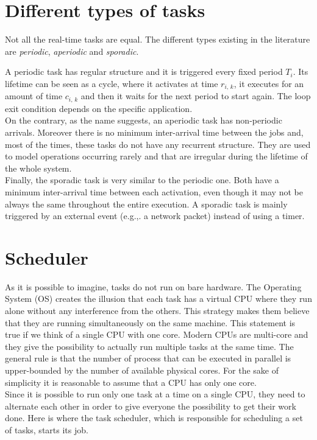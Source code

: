 \section{Different types of tasks}
Not all the real-time tasks are equal. The different types existing in
the literature are \emph{periodic}, \emph{aperiodic} and \emph{sporadic}.

A periodic task has regular structure
and it is triggered every fixed period \( T_{i} \). Its lifetime can be seen as
a cycle, where it activates at time \( r_{i,\,k} \), it executes for an amount 
of time \( c_{i,\,k} \) and then it waits for the next period to start again.
The loop exit condition depends on the specific application.\\
On the contrary, as the name suggests, an aperiodic task has non-periodic arrivals.
Moreover there is no minimum inter-arrival time between the jobs and,
most of the times, these tasks do not have any recurrent structure. They are used
to model operations occurring rarely and that are irregular during the lifetime
of the whole system.\\
Finally, the sporadic task is very similar to the periodic one. Both have a minimum
inter-arrival time between each activation, even though it may not be always the
same throughout the entire execution. A sporadic task is mainly triggered by an
external event (e.g.,. a network packet) instead of using a timer.


\section{Scheduler} \label{sec:scheduler}
As it is possible to imagine, tasks do not run on bare hardware.
The Operating System (OS) creates the illusion that each task has a virtual CPU
where they run alone without any interference from the others.
This strategy makes them believe that they are running simultaneously on the same
machine. This statement is true if we think of a single CPU with one core. Modern
CPUs are multi-core and they give the possibility to actually run multiple tasks
at the same time. The general rule is that the number of process that can be
executed in parallel is upper-bounded by the number of available physical cores.
For the sake of simplicity it is reasonable to assume that a CPU has only one core.\\
Since it is possible to run only one task at a time on a single CPU, they need
to alternate each other in order to give everyone the possibility to get their
work done. Here is where the task scheduler, which is responsible for
scheduling a set of tasks, starts its job.

